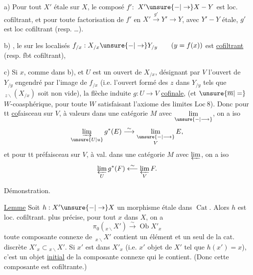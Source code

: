 a) Pour tout $X'$ étale sur $X$, le composé $f':$
$X'\unsure{-|\to}X-Y$ est loc. cofiltrant, et pour
toute factorisation de $f'$ en $X'\xrightarrow{g'}Y'\longrightarrow Y$,
avec $Y'-Y$ étale, $g'$ est loc cofiltrant (resp. \ldots).

b) ,  le  sur les localisés
 $f_{/x}:X_{/x}\unsure{-|\to}Y_{/y}\qquad(y=f(x))$
est \uline{cofiltrant} (resp. fbt cofiltrant),

 c) Si $x$,  comme dans b), et
$U$ est un ouvert de $X_{/x}$, désignant
par $V$ l'ouvert de $Y_{/y}$ engendré par
l'image de $f_{/x}$ (i.e. l'ouvert formé des
$z$ dans $Y_{/y}$ tels que $\,{}_{z\backslash}(X_{/x})$ soit non vide),
la flèche induite $g:U\longrightarrow V$   \uline{cofinale},
(et $\unsure{\overline{m}|=}$ $W$-coasphérique, pour toute $W$
satisfaisant l'axiome des limites $\mathrm{Loc}\ 8$).
Donc pour tt \uline{co}faisceau  sur $V$, à valeurs dans
une catégorie $M$ avec $\underset{\unsure{-|\longrightarrow}}{\lim}$, on a iso
\[
\underset{\unsure{U|u}}{\varinjlim}\,g^*(E)\stackrel{\sim}{\longrightarrow}
\underset{V}{\underset{\unsure{-|\longrightarrow}}{\lim}}\,E,
\]
et pour tt préfaisceau  sur $V$, à val. dans une
catégorie $M$ avec $\varprojlim$, on a iso
\[
\underset{U}{\varprojlim}\,g^*(F)\stackrel{\sim}{\longleftarrow}
\underset{V}{\varprojlim}\,F.
\]

Démonstration.  

\uline{Lemme}  Soit $h:X'\unsure{-|\to}X$ un morphisme étale
dans $\operatorname{Cat}$. Alors $h$ est loc. cofiltrant. 
plus précise, pour tout $x$ dans $X$, 
on a
\[
\pi_0({}_{x\backslash}X')\overset{\sim}{\longrightarrow}\operatorname{Ob} X'_x
\]
toute composante connexe de $\,{}_{x\backslash}X'$ contient
un élément et un seul de  la
cat. discrète $X'_x\subset{}_{x\backslash}X'$. Si $x'$ est dans
$X'_x$ (i.e.  $x'$ objet de $X'$ tel que $h(x')=x$),
c'est un objet \uline{initial} de la composante
connexe qui le contient. (Donc cette composante est cofiltrante.)

